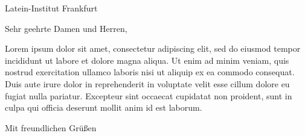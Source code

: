 \documentclass[
	sender,
	paper=a4,
	fontsize=11pt,
	DIV=13,
	BCOR=0mm,
	fromalign=right,
	fromemail=on,
	fromphone=on,
	fromurl=off,
	pagenumber=false,
	]{scrlttr2}
\renewcommand{\\}{\vspace*{0.5\baselineskip} \newline} %
\begin{document}
\begin{letter}{Latein-Institut \\ 60643 Frankfurt}
\opening{Sehr geehrte Damen und Herren,}
Lorem ipsum dolor sit amet, consectetur adipiscing elit, sed do eiusmod tempor incididunt ut labore et dolore magna aliqua. Ut enim ad minim veniam, quis nostrud exercitation ullamco laboris nisi ut aliquip ex ea commodo consequat. Duis aute irure dolor in reprehenderit in voluptate velit esse cillum dolore eu fugiat nulla pariatur. Excepteur sint occaecat cupidatat non proident, sunt in culpa qui officia deserunt mollit anim id est laborum.
\closing{Mit freundlichen Grüßen}
\end{letter}
\end{document}
